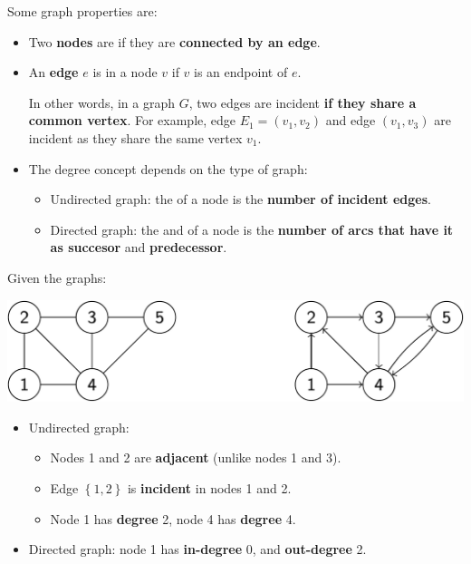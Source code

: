 \noindent
Some graph properties are:
\begin{itemize}
    \item Two \textbf{nodes} are  if they are \textbf{connected by an edge}.

    \item An \textbf{edge} $e$ is  in a node $v$ if $v$ is an endpoint of $e$.
    
    In other words, in a graph $G$, two edges are incident \textbf{if they share a common vertex}. For example, edge $E_{1}=\left(v_{1}, v_{2}\right)$ and edge $\left(v_{1}, v_{3}\right)$ are incident as they share the same vertex $v_{1}$.

    \item The degree concept depends on the type of graph:
    \begin{itemize}
        \item Undirected graph: the  of a node is the \textbf{number of incident edges}.

        \item Directed graph: the  and  of a node is the \textbf{number of arcs that have it as succesor} and \textbf{predecessor}.
    \end{itemize}
\end{itemize}

\highspace
\begin{examplebox}
    Given the graphs:
    
    \begin{center}
        \includegraphics[width=.8\textwidth]{img/graphs-2.pdf}
    \end{center}

    \begin{itemize}
        \item Undirected graph:
        \begin{itemize}
            \item Nodes 1 and 2 are \textbf{adjacent} (unlike nodes 1 and 3).
            \item Edge $\left\{1,2\right\}$ is \textbf{incident} in nodes 1 and 2.
            \item Node 1 has \textbf{degree} 2, node 4 has \textbf{degree} 4.
        \end{itemize}

        \item Directed graph: node 1 has \textbf{in-degree} 0, and \textbf{out-degree} 2.
    \end{itemize}
\end{examplebox}

